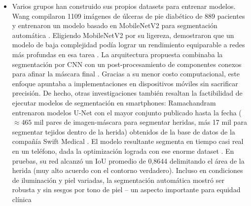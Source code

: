 \begin{itemize}
\begin{itemize}
        \item Varios grupos han construido sus propios datasets para entrenar modelos. Wang \cite{Wang2020} compilaron 1109 imágenes de úlceras de pie diabético de 889 pacientes y entrenaron un modelo basado en MobileNetV2 para segmentación automática . Eligiendo MobileNetV2 por su ligereza, demostraron que un modelo de baja complejidad podía lograr un rendimiento equiparable a redes más profundas en esa tarea . La arquitectura propuesta combinaba la segmentación por CNN con un post-procesamiento de componentes conexos para afinar la máscara final . Gracias a su menor costo computacional, este enfoque apuntaba a implementaciones en dispositivos móviles sin sacrificar precisión. De hecho, otras investigaciones también resaltan la factibilidad de ejecutar modelos de segmentación en smartphones: Ramachandram \cite{Ramachandram2022} entrenaron modelos U-Net con el mayor conjunto publicado hasta la fecha ($\approx465$ mil pares de imagen-máscara para segmentar heridas, más 17 mil para segmentar tejidos dentro de la herida) obtenidos de la base de datos de la compañía Swift Medical . El modelo resultante segmenta en tiempo casi real en un teléfono, dada la optimización lograda con ese enorme dataset . En pruebas, su red alcanzó un IoU promedio de 0,8644 delimitando el área de la herida (muy alto acuerdo con el contorno verdadero). Incluso en condiciones de iluminación y piel variadas, la segmentación automática mostró ser robusta y sin sesgos por tono de piel – un aspecto importante para equidad clínica


\end{itemize}
\end{itemize}
